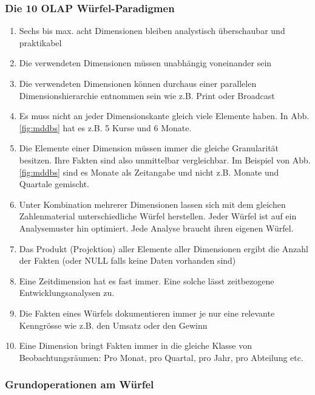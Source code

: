 \documentclass[a4paper, 11pt, nofootinbib]{article}
\begin{document}
\subsubsection{Die 10 OLAP Würfel-Paradigmen}
\begin{enumerate}
	\item Sechs bis max. acht Dimensionen bleiben analystisch überschaubar und praktikabel
	\item Die verwendeten Dimensionen müssen unabhängig voneinander sein
	\item Die verwendeten Dimensionen können durchaus einer parallelen Dimensionshierarchie entnommen sein wie z.B. Print oder Broadcast
	\item Es muss nicht an jeder Dimensionskante gleich viele Elemente haben. In Abb. \ref{fig:mddbs} hat es z.B. 5 Kurse und 6 Monate.
	\item Die Elemente einer Dimension müssen immer die gleiche Granularität besitzen. Ihre Fakten sind also unmittelbar vergleichbar. Im Beispiel von Abb. \ref{fig:mddbs} sind es Monate als Zeitangabe und nicht z.B. Monate und Quartale gemischt.
	\item Unter Kombination mehrerer Dimensionen lassen sich mit dem gleichen Zahlenmaterial unterschiedliche Würfel herstellen. Jeder Würfel ist auf ein Analysemuster hin optimiert. Jede Analyse braucht ihren eigenen Würfel.
	\item Das Produkt (Projektion) aller Elemente aller Dimensionen ergibt die Anzahl der Fakten (oder NULL falls keine Daten vorhanden sind)
	\item Eine Zeitdimension hat es fast immer. Eine solche lässt zeitbezogene Entwicklungsanalysen zu.
	\item Die Fakten eines Würfels dokumentieren immer je nur eine relevante Kenngrösse wie z.B. den Umsatz oder den Gewinn
	\item Eine Dimension bringt Fakten immer in die gleiche Klasse von Beobachtungsräumen: Pro Monat, pro Quartal, pro Jahr, pro Abteilung etc.
\end{enumerate}

\subsubsection{Grundoperationen am Würfel}
\end{document}
